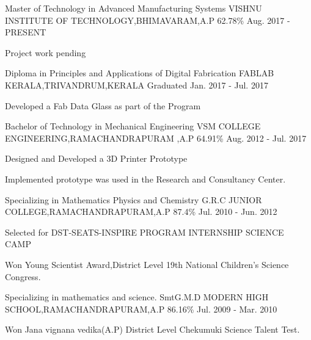 \begin{cventries}
  \cventry
    {Master of Technology in Advanced Manufacturing Systems}
    {VISHNU INSTITUTE OF TECHNOLOGY,BHIMAVARAM,A.P}
    {62.78\%}
    {Aug. 2017 - PRESENT}
    {
      \begin{cvitems}
        \item {Project work pending}  
      \end{cvitems}
    }
  \cventry
    {Diploma in Principles and Applications of Digital Fabrication}
    {FABLAB KERALA,TRIVANDRUM,KERALA}
    {Graduated}
    {Jan. 2017 - Jul. 2017}
    {
      \begin{cvitems}
        \item {Developed a Fab Data Glass as part of the Program }
      \end{cvitems}
    }
  \cventry
    {Bachelor of Technology in Mechanical Engineering}
    {VSM COLLEGE ENGINEERING,RAMACHANDRAPURAM ,A.P}
    {64.91\%}
    {Aug. 2012 - Jul. 2017}
    {
      \begin{cvitems}
        \item {Designed and Developed a 3D Printer Prototype }
        \item {Implemented prototype was used in the Research and Consultancy Center.}
      \end{cvitems} 
    }
  \cventry
    {Specializing in Mathematics Physics and Chemistry}
    {G.R.C JUNIOR COLLEGE,RAMACHANDRAPURAM,A.P}
    {87.4\%}
    {Jul. 2010 - Jun. 2012}
    {
      \begin{cvitems}
	\item{Selected for DST-SEATS-INSPIRE PROGRAM INTERNSHIP SCIENCE CAMP}
        \item {Won Young Scientist Award,District Level 19th National Children's Science Congress.}
      \end{cvitems}
    }
  \cventry
    {Specializing in mathematics and science.}
    {SmtG.M.D MODERN HIGH SCHOOL,RAMACHANDRAPURAM,A.P}
    {86.16\%}
    {Jul. 2009 - Mar. 2010}
    {
      \begin{cvitems}
        \item {Won Jana vignana vedika(A.P) District Level Chekumuki Science Talent Test.}
      \end{cvitems}
}
\end{cventries}
